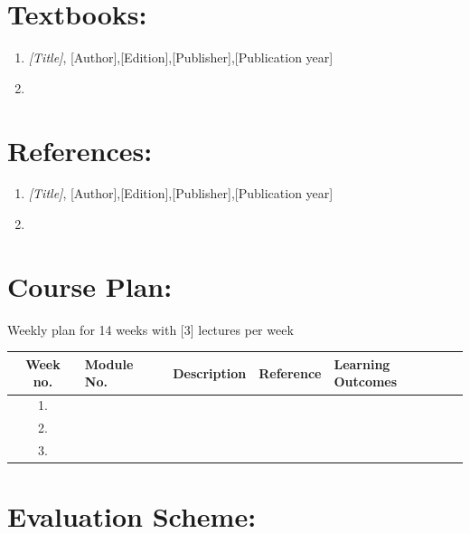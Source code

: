 \documentclass[11pt]{article}
\begin{document}
\begin{sf}
\section{Textbooks:}
\begin{enumerate}[label=\bfseries{ TB{\arabic*}.}, 
                leftmargin=2cm]
\item  \textit{[Title]}, [Author],[Edition],[Publisher],[Publication year]
\item 
\end{enumerate}
\section*{  References:}
\begin{enumerate}[label=\bfseries{Ref{\arabic*}.}, 
                leftmargin=2cm]
\item  \textit{[Title]}, [Author],[Edition],[Publisher],[Publication year]
\item 
\end{enumerate}

\section{ Course Plan:}
Weekly plan for 14 weeks with [3] lectures per week
\begin{center}
\renewcommand{\arraystretch}{1.5}
\begin{tabular}{|c|l|l|l|l|}
\hline
\textbf{Week no.} & \textbf{Module No.} & \textbf{Description} & \textbf{Reference} & \textbf{Learning Outcomes} \\
\hline

1.& & &  & \\
\hline
 2. &  & & &  \\
\hline
3.  &  &  & &  \\
\hline

\end{tabular}
\end{center}

\section{Evaluation Scheme:}


\end{sf}
\end{document}
